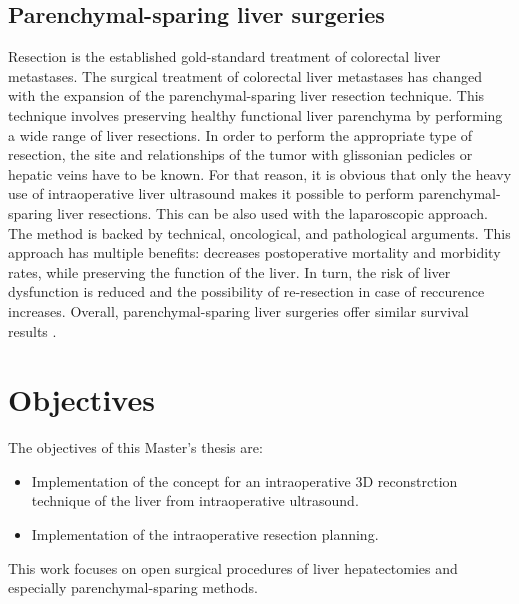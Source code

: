 \subsection{Parenchymal-sparing liver surgeries}
Resection is the established gold-standard treatment of colorectal liver
metastases. The surgical treatment of colorectal liver metastases has changed with the expansion of the
parenchymal-sparing liver resection technique. This technique involves preserving healthy
functional liver parenchyma by performing a wide range of liver resections. In
order to perform the appropriate type of resection, the site and
relationships of the tumor with glissonian pedicles or hepatic veins have to be
known.
For that reason, it is obvious that only the heavy use of intraoperative liver
ultrasound makes it possible to perform parenchymal-sparing liver resections.
This can be also used with the laparoscopic approach. The method is backed by technical, oncological,
and pathological arguments.
This approach has multiple benefits: decreases postoperative mortality and
morbidity rates, while preserving the function of the liver. In turn, the risk
of liver dysfunction is reduced and the possibility of re-resection in case of
reccurence increases. Overall, parenchymal-sparing liver surgeries offer
similar survival results \cite{Ferrero2017}.

\cite{alvarez2016parenchymal}
\section{Objectives} 
The objectives of this Master's thesis are:
\begin{itemize}
  \item Implementation of the concept for an intraoperative 3D reconstrction
  technique of the liver from intraoperative ultrasound. 
  \item Implementation of the intraoperative resection planning.
\end{itemize}
This work focuses on open surgical procedures of liver hepatectomies and
especially parenchymal-sparing methods.



\endinput
